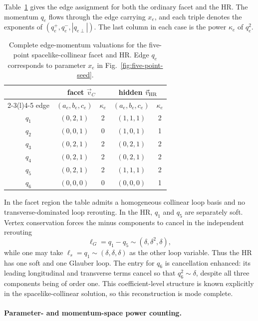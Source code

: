 \documentclass[a4paper,11pt]{article}
\newcommand{\vHR}{\vec v_{\rm HR}}
\begin{document}
Table~\ref{tab:five-sc-edge-flow} gives the edge assignment for both the
ordinary facet and the HR.  The momentum \(q_e\) flows through the edge
carrying \(x_e\), and each triple denotes the exponents of
\((q_e^+,q_e^-,|q_{e\perp}|)\).  The last column in each case is the power
\(\kappa_e\) of \(q_e^2\).
\begin{table}[htbp]
\centering
\small
\begin{tabular}{@{}c cc cc@{}}
\toprule
& \multicolumn{2}{c}{facet \(\vec v_C\)}
& \multicolumn{2}{c}{hidden \(\vHR\)}\\
\cmidrule(lr){2-3}\cmidrule(l){4-5}
edge & \((a_e,b_e,c_e)\) & \(\kappa_e\)
     & \((a_e,b_e,c_e)\) & \(\kappa_e\)\\
\midrule
\(q_1\) & \((0,2,1)\) & 2 & \((1,1,1)\) & 2\\
\(q_2\) & \((0,0,1)\) & 0 & \((1,0,1)\) & 1\\
\(q_3\) & \((0,2,1)\) & 2 & \((0,2,1)\) & 2\\
\(q_4\) & \((0,2,1)\) & 2 & \((0,2,1)\) & 2\\
\(q_5\) & \((0,2,1)\) & 2 & \((1,1,1)\) & 2\\
\(q_6\) & \((0,0,0)\) & 0 & \((0,0,0)\) & 1\\
\bottomrule
\end{tabular}
\caption{Complete edge-momentum valuations for the five-point
spacelike-collinear facet and HR.  Edge \(q_e\) corresponds to parameter
\(x_e\) in Fig.~\ref{fig:five-point-seed}.}
\label{tab:five-sc-edge-flow}
\end{table}

In the facet region the table admits a homogeneous collinear loop basis and
no transverse-dominated loop rerouting.  In the HR, \(q_1\) and \(q_5\) are
separately soft.  Vertex conservation forces the minus components to cancel
in the independent rerouting
\begin{equation}
 \ell_G=q_1-q_5\sim(\delta,\delta^2,\delta),
 \label{eq:five-sc-glauber-rerouting}
\end{equation}
while one may take \(\ell_s=q_1\sim(\delta,\delta,\delta)\) as the other
loop variable.  Thus the HR has one soft and one Glauber loop.  The entry for
\(q_6\) is cancellation enhanced: its leading longitudinal and transverse
terms cancel so that \(q_6^2\sim\delta\), despite all three components being
of order one.  This coefficient-level structure is known explicitly in the
spacelike-collinear solution, so this reconstruction is mode complete.

\paragraph{Parameter- and momentum-space power counting.}
\end{document}
